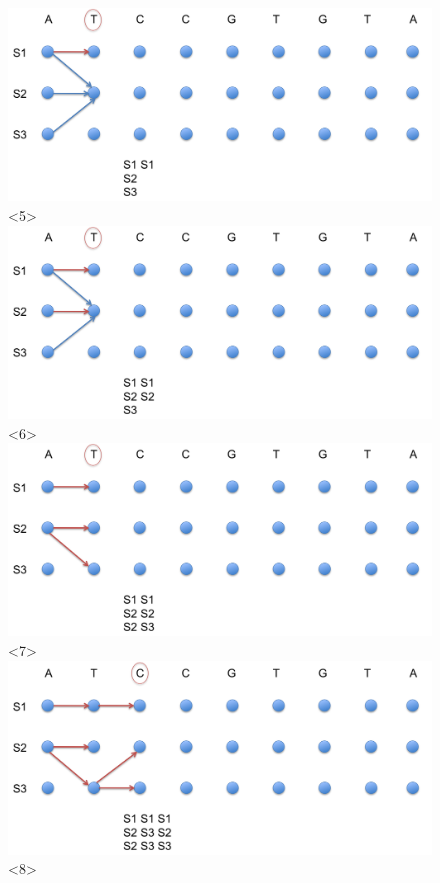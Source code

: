 \documentclass{beamer}[12pt]
\begin{document}
\begin{frame}
\begin{figure}[h]
			\includegraphics[width=1.0\textwidth]{../picturesforthepresentation/Viterbi5.png}<5>
			\includegraphics[width=1.0\textwidth]{../picturesforthepresentation/Viterbi6.png}<6>
			\includegraphics[width=1.0\textwidth]{../picturesforthepresentation/Viterbi7.png}<7>
			\includegraphics[width=1.0\textwidth]{../picturesforthepresentation/Viterbi8.png}<8>

\end{figure}
\end{frame}
\end{document}

